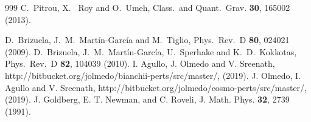 \documentclass[11pt,tightenlines,eqsecnum,floats,aps,amsmath,amssymb,nofootinbib,prd,floatfix]{revtex4}
\newcommand{\<}{\langle}
\renewcommand{\>}{\rangle}
\begin{document}
\begin{thebibliography}{999}
C.~Pitrou, X.~ Roy and O.~Umeh, 
Class.~and Quant.~Grav. {\bf 30}, 165002 (2013). 

	D.\ Brizuela, J.\ M.\ Mart\'in-Garc\'ia and M.\ Tiglio, 
	Phys.\ Rev.\ D {\bf 80}, 024021 (2009).
%
	D.\ Brizuela, J.\ M.\ Mart\'in-Garc\'ia, U.\ Sperhake and K.\ D.\ Kokkotas, 
	Phys.\ Rev.\ D {\bf 82}, 104039 (2010).
%
        I. Agullo, J. Olmedo and V. Sreenath, http://bitbucket.org/jolmedo/bianchii-perts/src/master/, (2019).
%
        J. Olmedo, I. Agullo and V. Sreenath, http://bitbucket.org/jolmedo/cosmo-perts/src/master/, (2019).
%
        J. Goldberg, E. T. Newman, and C. Roveli, 
        J. Math. Phys. {\bf 32}, 2739 (1991).
\end{thebibliography}
\end{document}

